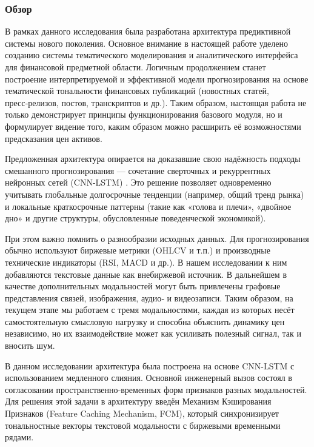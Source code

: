 \subsubsection{Обзор}

В рамках данного исследования была разработана архитектура предиктивной системы нового поколения.
Основное внимание в настоящей работе уделено созданию системы тематического моделирования и аналитического
интерфейса для финансовой предметной области. Логичным продолжением станет построение интерпретируемой
и эффективной модели прогнозирования на основе тематической тональности финансовых публикаций
(новостных статей, пресс‑релизов, постов, транскриптов и др.). Таким образом, настоящая работа
не только демонстрирует принципы функционирования базового модуля, но и формулирует видение того,
каким образом можно расширить её возможностями предсказания цен активов.

Предложенная архитектура опирается на доказавшие свою надёжность подходы смешанного прогнозирования ---
сочетание сверточных и рекуррентных нейронных сетей (CNN-LSTM) \parencite{Hochreiter1997LSTM, CNN1998lecun, CNN_LSTM2020finance}.
Это решение позволяет одновременно учитывать глобальные долгосрочные тенденции (например, общий тренд рынка)
и локальные краткосрочные паттерны (такие как «голова и плечи», «двойное дно» и другие структуры,
обусловленные поведенческой экономикой).

При этом важно помнить о разнообразии исходных данных. Для прогнозирования обычно используют биржевые метрики
(OHLCV и т.п.) и производные технические индикаторы (RSI, MACD и др.).
В нашем исследовании к ним добавляются текстовые данные как внебиржевой источник. В дальнейшем в
качестве дополнительных модальностей могут быть привлечены графовые представления связей, изображения,
аудио‑ и видеозаписи. Таким образом, на текущем этапе мы работаем с тремя модальностями, каждая из которых
несёт самостоятельную смысловую нагрузку и способна объяснить динамику цен независимо, но их взаимодействие
может как усиливать полезный сигнал, так и вносить шум.

В данном исследовании архитектура была построена на основе CNN-LSTM с использованием медленного слияния.
Основной инженерный вызов состоял в согласовании пространственно‑временных форм признаков разных модальностей.
Для решения этой задачи в архитектуру введён Механизм Кэширования Признаков (Feature Caching Mechanism, FCM),
который синхронизирует тональностные векторы текстовой модальности с биржевыми временными рядами.

